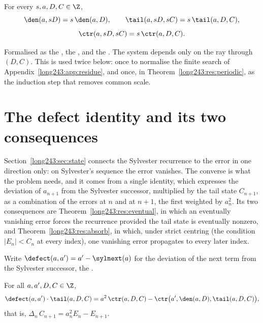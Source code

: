 \begin{proposition}\label{long243:res:scale}
For every $s,a,D,C\in\Z$,
\[
 \den(a,sD)=s\,\den(a,D),\qquad
 \tail(a,sD,sC)=s\,\tail(a,D,C),
\]
\[
 \ctr(a,sD,sC)=s\,\ctr(a,D,C).
\]
\end{proposition}

\noindent Formalised as the
, the
, and the
.  The system depends only on the ray through $(D,C)$.  This is
used twice below: once to normalise the finite search of
Appendix~\ref{long243:app:residue}, and once, in Theorem~\ref{long243:res:periodic}, as the
induction step that removes common scale.

\section{The defect identity and its two consequences}\label{long243:sec:defect}

Section~\ref{long243:sec:state} connects the Sylvester recurrence to the error in one
direction only: on Sylvester's sequence the error vanishes.  The converse is
what the problem needs, and it comes from a single identity, which expresses
the deviation of $a_{n+1}$
from the Sylvester successor, multiplied by the tail state $C_{n+1}$, as a
combination of the errors at $n$ and at $n+1$, the first weighted by
$a_n^{2}$.  Its two consequences are
Theorem~\ref{long243:res:eventual}, in which an eventually vanishing error forces the
recurrence provided the tail state is eventually nonzero, and
Theorem~\ref{long243:res:absorb}, in which, under strict centring (the condition
$|E_n|<C_n$ at every index), one vanishing error propagates to every later
index.

Write $\defect(a,a')=a'-\sylnext(a)$ for the deviation of the next term from
the Sylvester successor, the
.

\begin{theorem}\label{long243:res:defect}
For all $a,a',D,C\in\Z$,
\[
 \defect(a,a')\cdot\tail(a,D,C)
 =a^{2}\,\ctr(a,D,C)-\ctr\bigl(a',\den(a,D),\tail(a,D,C)\bigr),
\]
that is, $\Delta_n\,C_{n+1}=a_n^{2}E_n-E_{n+1}$.
\end{theorem}

